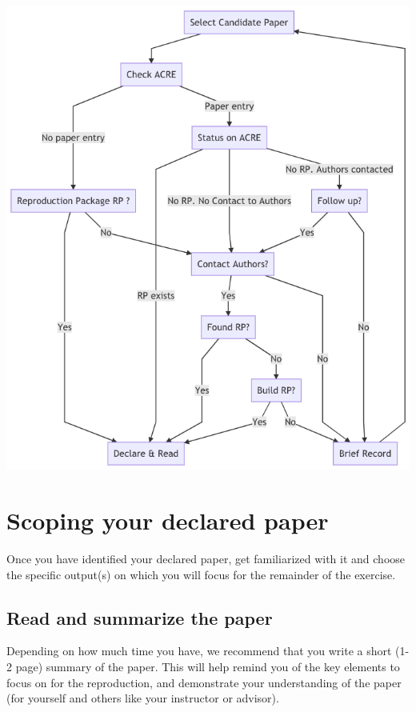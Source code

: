 \documentclass[]{book}
\begin{document}
\includegraphics{candidate-to-declared-paper.png}

\hypertarget{scoping-your-declared-paper}{%
\section{Scoping your declared paper}\label{scoping-your-declared-paper}}

Once you have identified your declared paper, get familiarized with it and choose the specific output(s) on which you will focus for the remainder of the exercise.

\hypertarget{read-sum}{%
\subsection{Read and summarize the paper}\label{read-sum}}

Depending on how much time you have, we recommend that you write a short (1-2 page) summary of the paper. This will help remind you of the key elements to focus on for the reproduction, and demonstrate your understanding of the paper (for yourself and others like your instructor or advisor).
\end{document}
